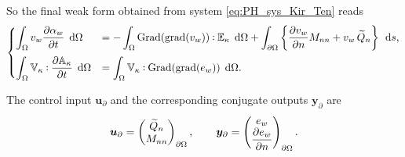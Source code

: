 \documentclass[preprint,12pt]{elsarticle}
\def\onedot{$\mathsurround0pt\ldotp$}
\def\cddot{%
	\mathbin{\vcenter{\baselineskip.67ex
			\hbox{\onedot}\hbox{\onedot}}%
}}
\begin{document}
	So the final weak form obtained from system \eqref{eq:PH_sys_Kir_Ten} reads
	\begin{equation}
	\begin{cases}
	\displaystyle\int_{\Omega} v_w \diffp{\alpha_w}{t} \, \d\Omega  &=  -  \displaystyle\int_{\Omega} \mathrm{Grad}(\mathrm{grad}(v_w))  \cddot \mathbb{E}_{\kappa} \, \d\Omega +  \displaystyle\int_{\partial \Omega} \left\{ \diffp{v_w}{n} M_{nn}  + v_w \, \widetilde{Q}_n \right\}   \, \d{s},  \vspace{2mm}\\
	\displaystyle\int_{\Omega} \mathbb{V}_{\kappa} \cddot \diffp{\mathbb{A}_{\kappa}}{t} \, \d\Omega &= \displaystyle\int_{\Omega} \mathbb{V}_{\kappa} \cddot \mathrm{Grad}(\mathrm{grad}(e_w)) \, \d\Omega. 
	\end{cases}
	\end{equation}
	
	The control input $\bm{u}_\partial$ and the corresponding conjugate outputs $\bm{y}_\partial$ are 
	\[\bm{u}_\partial = 
	\begin{pmatrix}
	\widetilde{Q}_n \\
	M_{nn} \\
	\end{pmatrix}_{\partial \Omega}, \qquad
	\bm{y}_\partial = 
	\begin{pmatrix}
	e_w \\
	\displaystyle \diffp{e_w}{n} \\
	\end{pmatrix}_{\partial \Omega}.
	\]

	
\end{document}
